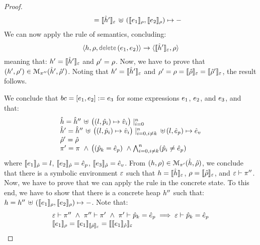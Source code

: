 \begin{proof}
$$\begin{array}{l}
         \qquad = \semexpr{\sheap'}{\senv} \dunion (\symbeval{\jsilexpr_1}{\store}, \symbeval{\jsilexpr_2}{\store}) \mapsto -
\end{array}
$$
We can now apply the  rule of \jsil semantics, concluding: 
$$
   \semtrans{\heap, \store, \jsildelete(\jsilexpr_1, \jsilexpr_2)}{\semexpr{\sheap'}{\senv},  \store}
$$
meaning that: $\heap' = \semexpr{\sheap'}{\senv}$ and $\store' = \store$.
Now, we have to prove that $(\heap', \store') \in \smodels{\sheap', \sstore'}{\pc''}$.
Noting that $\heap' = \semexpr{\sheap'}{\senv}$ and $\store' = \store = \semexpr{\sstore}{\senv} = \semexpr{\sstore'}{\senv}$, 
the result follows. 
\vspace{6pt}

\noindent{}
We conclude that  $\bcmd = [\jsilexpr_1, \jsilexpr_2] := \jsilexpr_3$ for some expressions $\jsilexpr_1$, $\jsilexpr_2$, 
and $\jsilexpr_3$, and that: 
$$
\begin{array}{l}
  \sheap =  \sheap'' \, \uplus \, \big((l, \sexprp_i) \mapsto \sexprv_i\big)\mid_{i = 0}^n    \\
  \sheap' = \sheap'' \, \uplus \,  \big((l, \sexprp_i) \mapsto \sexprv_i\big)\mid_{i = 0, i \neq k}^n \, \uplus \,  (l, \sexpr_p) \mapsto \sexpr_v  \\
  \sstore' = \sstore \\ 
  \pc' = \pc \ \wedge \, \big( (\sexprp_k = \sexpr_p) \ \wedge \bigwedge_{i = 0, i \neq k}^n (\sexprp_i \neq \sexpr_p)
\end{array}
$$ 
where $\symbeval{\jsilexpr_1}{\sstore} =  \loc$, $\symbeval{\jsilexpr_2}{\sstore} =  \sexpr_p$, 
$\symbeval{\jsilexpr_3}{\sstore} =  \sexpr_v$.
From $(\heap, \store) \in \smodels{\sheap, \sstore}{\pc'}$, we conclude that there is a symbolic environment
$\senv$ such that $\heap = \semexpr{\sheap}{\senv}$, $\store = \semexpr{\sstore}{\senv}$, and 
$\senv \vdash \pc''$. 
Now, we have to prove that we can apply the  rule in the concrete state.
To this end, we have to show that there is a concrete heap $\heap''$ such that:
$\heap = \heap'' \dunion \hcell{\symbeval{\jsilexpr_1}{\store}}{\symbeval{\jsilexpr_2}{\store}}{-}$. 
Note that: 
$$
\begin{array}{l}
%
\senv \vdash \pc'' \ \wedge \ \pc'' \vdash \pc' \ \wedge \ \pc' \vdash \sexprp_k = \sexpr_p \implies \senv \vdash \sexprp_k = \sexpr_p \\
%
 \symbeval{\jsilexpr_1}{\store} = \symbeval{\jsilexpr_1}{\symbeval{\sstore}{\senv}} = \symbeval{\symbeval{\jsilexpr_1}{\sstore}}{\senv} 

\end{array}$$
\end{proof}
